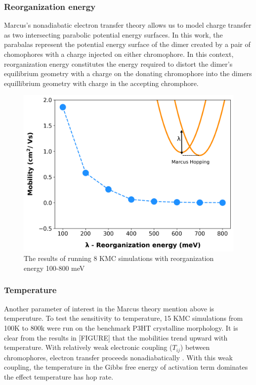 \subsubsection{Reorganization energy}
Marcus's nonadiabatic electron transfer theory allows us to model charge transfer as two
intersecting parabolic potential energy surfaces. In this work, the parabalas represent the potential energy surface
of the dimer created by a pair of chomophores with a charge injected on either chromophore. In this context, 
reorganization energy constitutes the energy required to distort the dimer's equilibrium geometry with a
charge on the donating chromophore into the dimers equillibrium geometry with charge in the accepting
chromphore. 
\begin{figure}
  \center
  \includegraphics[width=\linewidth, height=\textheight,keepaspectratio]{figures/reorg.png} 
    \caption{The results of running 8 KMC simulations with reorganization energy 100-800 meV}
  \label{fig:reorg}
\end{figure}

\subsubsection{Temperature}

Another parameter of interest in the Marcus theory mention above is temperuture. To test the sensitivity to
temperature, 15 KMC simulations from 100K to 800k were run on the benchmark P3HT crystalline morphology. It
is clear from the results in [FIGURE] that the mobilities trend upward with temperature. With relatively
weak electronic coupling ($T_{ij}$) between chromophores, electron transfer proceeds nonadiabatically
\cite{clarke2010}. With this weak coupling, the temperature in the Gibbs free energy of activation term
dominates the effect temperature has hop rate. 

